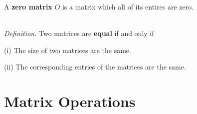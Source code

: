 \noindent A \textbf{zero matrix} $O$ is a matrix which all of its entires are zero.

\noindent \\ \textit{Definition.} Two matrices are \textbf{equal} if and only if

(i) The size of two matrices are the same.

(ii) The corresponding entries of the matrices are the same.

\section{Matrix Operations}

\lipsum[5-6]
